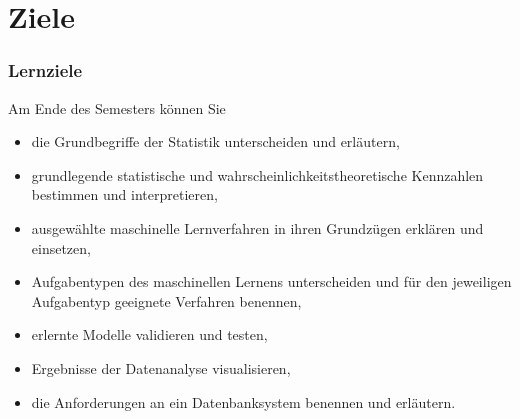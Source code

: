 \section*{Ziele}
\begin{frame}
\frametitle{Lernziele}
Am Ende des Semesters können Sie
\begin{itemize}
\item die Grundbegriffe der Statistik unterscheiden und erläutern,
\pause
\item grundlegende statistische und wahrscheinlichkeitstheoretische Kennzahlen bestimmen und interpretieren,
\pause
\item ausgewählte maschinelle Lernverfahren in ihren Grundzügen erklären und einsetzen,
\pause
\item Aufgabentypen des maschinellen Lernens unterscheiden und für den jeweiligen Aufgabentyp geeignete Verfahren benennen,
\pause
\item erlernte Modelle validieren und testen,
\pause
\item Ergebnisse der Datenanalyse visualisieren,
\pause
\item die Anforderungen an ein Datenbanksystem benennen und erläutern.
\end{itemize}
\end{frame}
